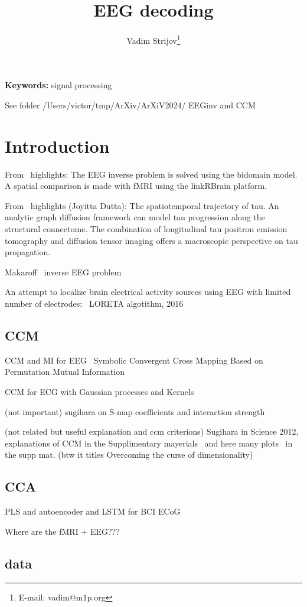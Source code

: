 \documentclass[12pt]{article}
\begin{document}
\title{EEG decoding}
\author{Vadim Strijov\footnote{E-mail: vadim@m1p.org}}
\maketitle

\begin{abstract}
\end{abstract}
\noindent \textbf{Keywords:} signal processing
 
See folder /Users/victor/tmp/ArXiv/ArXiV2024/ EEGinv and CCM
 
\section{Introduction}


From~\cite{LopezRincon2016} highlights: The EEG inverse problem is solved using the bidomain model. A spatial comparison is made with fMRI using the linkRBrain platform.\cite{LopezRincon2016}

From~\cite{Yang2021} highlights (Joyitta Dutta): The spatiotemporal trajectory of tau.  An analytic graph diffusion framework can model tau progression along the structural connectome. The combination of longitudinal tau positron emission tomography and diffusion tensor imaging offers a macroscopic perspective on tau propagation.

Makaroff~\cite{Makaroff2023} inverse EEG problem

An attempt to localize brain electrical activity sources using EEG with limited
number of electrodes:~\cite{Majkowski2016} LORETA algotithm, 2016

\subsection{CCM}
CCM and MI for EEG~\cite{Ge2022}  Symbolic Convergent Cross Mapping Based on Permutation Mutual Information

CCM for ECG with Gaussian processes and Kernels \cite{Feng2020}

(not important) sugihara on S-map coefficients and interaction strength~\cite{Munch2022}\cite{Sugihara2012}

(not related but useful explanation and ccm criterions) Sugihara in Science 2012, explanations of CCM in the Supplimentary mayerials~\cite{Sugihara2012} and here many plots~\cite{Ye2016} in the supp mat. (btw it titles Overcoming the curse of dimensionality)




\subsection{CCA}
PLS and autoencoder and LSTM for BCI ECoG \cite{Ran2022}



Where are the fMRI + EEG???


\subsection{data}
\cite{Berezutskaya2022}\cite{Musk2019}



\end{document}

